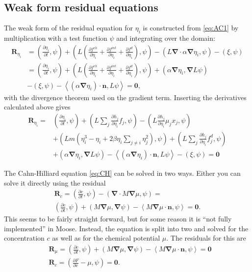 \documentclass[12pt,a4paper]{article}
\newcommand{\partdiff}[2]{\frac{\partial#1}{\partial#2}}
\providecommand{\vbf}[1]{\boldsymbol{#1}}
\providecommand{\gradient}[0]{\vbf{\nabla}}
\providecommand{\vint}[2]{\left(#1,#2\right)}
\providecommand{\sint}[2]{\left<#1,#2\right>}
\begin{document}
\subsection{Weak form residual equations}
The weak form of the residual equation for $\eta_i$ is constructed from \cref{eq:AC1} by multiplication with a test function $\psi$ and integrating over the domain:
\begin{equation}
\begin{aligned}
  \vbf{R}_{\eta_i}&=\vint{\partdiff{\eta_i}{t}}{\psi}+\vint{L\left(\partdiff{f^{ch}}{\eta_i}+\partdiff{f^{int}}{\eta_i}+\partdiff{f^d}{\eta_i}\right)}{\psi}-\vint{L\gradient\cdot\alpha\gradient\eta_i}{\psi}-\vint{\xi}{\psi} \\
  &=\vint{\partdiff{\eta_i}{t}}{\psi}+\vint{L\left(\partdiff{f^{ch}}{\eta_i}+\partdiff{f^{int}}{\eta_i}+\partdiff{f^d}{\eta_i}\right)}{\psi}+\vint{\alpha\gradient\eta_i}{\gradient L\psi}\\
  &-\vint{\xi}{\psi}-\sint{(\alpha\gradient\eta_i)\cdot\vbf{n}}{L\psi}=\vbf{0},
\end{aligned}
\end{equation}
with the divergence theorem used on the gradient term.
Inserting the derivatives calculated above gives
\begin{equation}
\begin{aligned}
  \vbf{R}_{\eta_i}=&\vint{\partdiff{\eta_i}{t}}{\psi}+\vint{L\sum_j\partdiff{h_j}{\eta_i}f_j}{\psi}-\vint{L\partdiff{h_j}{\eta_i}\mu_jx_j}{\psi}\\
  &+\vint{Lm\left(\eta_i^3-\eta_i+2\beta\eta_i\sum_{j\ne i}\eta_j^2\right)}{\psi}+\vint{L\sum_j\partdiff{h_j}{\eta_i}f^d_j}{\psi} \\
  &+\vint{\alpha\gradient\eta_i}{\gradient L\psi} -\sint{(\alpha\gradient\eta_i)\cdot\vbf{n}}{L\psi}-\vint{\xi}{\psi}=\vbf{0}
 \end{aligned}
\end{equation}

The Cahn-Hilliard equation \cref{eq:CH} can be solved in two ways.
Either you can solve it directly using the residual
\begin{multline}
  \vbf{R}_c=\vint{\partdiff{c}{t}}{\psi}-\vint{\gradient\cdot M\gradient\mu}{\psi}=\\ \vint{\partdiff{c}{t}}{\psi}+\vint{M\gradient\mu}{\gradient\psi}-\sint{M\gradient\mu\cdot\vbf{n}}{\psi}=\vbf{0}.
\end{multline}
This seems to be fairly straight forward, but for some reason it is ``not fully implemented'' in Moose.
Instead, the equation is split into two and solved for the concentration $c$ as well as for the chemical potential $\mu$.
The residuals for this are
\begin{align}
  &\vbf{R}_\mu=\vint{\partdiff{c}{t}}{\psi}+\vint{M\gradient\mu}{\gradient\psi}-\sint{M\gradient\mu\cdot\vbf{n}}{\psi}=\vbf{0} \\
  &\vbf{R}_c=\vint{\partdiff{F}{c}-\mu}{\psi}=\vbf{0}.
\end{align}
\end{document}
